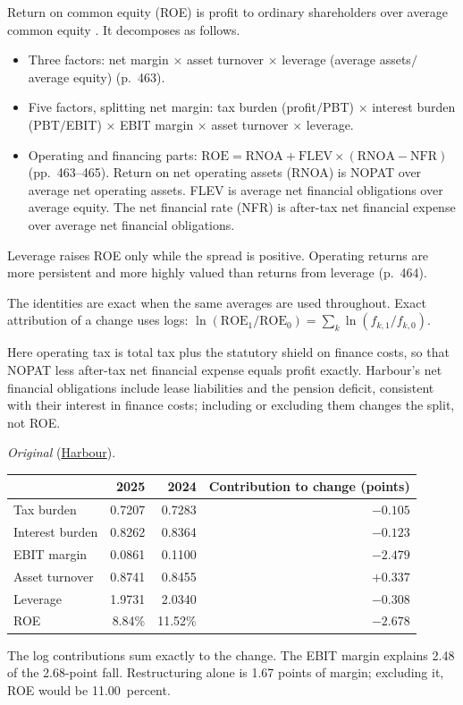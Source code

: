 \begin{qfmethod}\label{meth:return-on-equity-decomposition}
 Return on common equity (ROE) is profit to ordinary shareholders over average common equity \citep[p.~449]{financial-statement-analysis-2009}. It decomposes as follows.
\begin{itemize}
\item Three factors: net margin $\times$ asset turnover $\times$ leverage (average assets$/$average equity) (p.~463).
\item Five factors, splitting net margin: tax burden (profit$/$PBT) $\times$ interest burden (PBT$/$EBIT) $\times$ EBIT margin $\times$ asset turnover $\times$ leverage.
\item Operating and financing parts: $\text{ROE}=\text{RNOA}+\text{FLEV}\times(\text{RNOA}-\text{NFR})$ (pp.~463--465). Return on net operating assets (RNOA) is NOPAT over average net operating assets. FLEV is average net financial obligations over average equity. The net financial rate (NFR) is after-tax net financial expense over average net financial obligations.
\end{itemize}
Leverage raises ROE only while the spread is positive. Operating returns are more persistent and more highly valued than returns from leverage (p.~464).

 The identities are exact when the same averages are used throughout. Exact attribution of a change uses logs: $\ln(\text{ROE}_1/\text{ROE}_0)=\sum_k\ln(f_{k,1}/f_{k,0})$.

 Here operating tax is total tax plus the statutory shield on finance costs, so that NOPAT less after-tax net financial expense equals profit exactly. Harbour's net financial obligations include lease liabilities and the pension deficit, consistent with their interest in finance costs; including or excluding them changes the split, not ROE.

 \emph{Original} (\hyperref[ex:harbour-tools-statements]{Harbour}).

\begin{center}\small
\begin{tabular}{@{}lrrr@{}}
\toprule
 & 2025 & 2024 & Contribution to change (points)\\
\midrule
Tax burden & 0.7207 & 0.7283 & $-0.105$\\
Interest burden & 0.8262 & 0.8364 & $-0.123$\\
EBIT margin & 0.0861 & 0.1100 & $-2.479$\\
Asset turnover & 0.8741 & 0.8455 & $+0.337$\\
Leverage & 1.9731 & 2.0340 & $-0.308$\\
ROE & 8.84\% & 11.52\% & $-2.678$\\
\bottomrule
\end{tabular}
\end{center}
The log contributions sum exactly to the change. The EBIT margin explains 2.48 of the 2.68-point fall. Restructuring alone is 1.67 points of margin; excluding it, ROE would be 11.00~percent.


\end{qfmethod}
